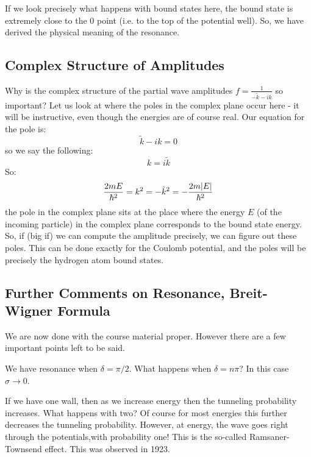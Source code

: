 If we look precisely what happens with bound states here, the bound state is extremely close to the $0$ point (i.e. to the top of the potential well). So, we have derived the physical meaning of the resonance.


\subsection{Complex Structure of Amplitudes}
Why is the complex structure of the partial wave amplitudes $f = \frac{1}{-\tilde{k} - ik}$ so important? Let us look at where the poles in the complex plane occur here - it will be instructive, even though the energies are of course real. Our equation for the pole is:
\begin{equation}
    \tilde{k} - ik = 0
\end{equation}
so we say the following:
\begin{equation}
    k = i\tilde{k}
\end{equation}
So:
\begin{equation}
    \frac{2mE}{\hbar^2} = k^2 = -\tilde{k}^2 = -\frac{2m\lvert E \rvert}{\hbar^2}
\end{equation}
the pole in the complex plane sits at the place where the energy $E$ (of the incoming particle) in the complex plane corresponds to the bound state energy. So, if (big if) we can compute the amplitude precisely, we can figure out these poles. This can be done exactly for the Coulomb potential, and the poles will be precisely the hydrogen atom bound states.

\subsection{Further Comments on Resonance, Breit-Wigner Formula} %
We are now done with the course material proper. However there are a few important points left to be said.

We have resonance when $\delta = \pi/2$. What happens when $\delta = n\pi$? In this case $\sigma \to 0$.

If we have one wall, then as we increase energy then the tunneling probability increases. What happens with two? Of course for most energies this further decreases the tunneling probability. However, at energy, the wave goes right through the potentials,with probability one! This is the so-called Ramsaner-Townsend effect. This was observed in 1923.

